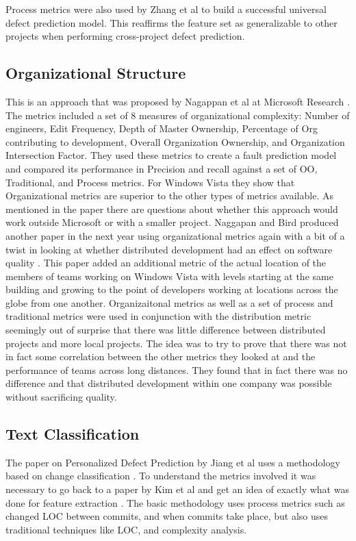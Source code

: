 \documentclass{sig-alternate-05-2015}
\begin{document}
Process metrics were also used by Zhang et al \cite{Zhang2014} to build a successful universal defect prediction model. This reaffirms the feature set as generalizable to other projects when performing cross-project defect prediction.

\subsection{Organizational Structure}
This is an approach that was proposed by Nagappan et al at Microsoft Research \cite{Nagappan}.  The metrics included a set of 8 measures of organizational complexity: Number of engineers, Edit Frequency, Depth of Master Ownership, Percentage of Org contributing to development, Overall Organization Ownership, and Organization Intersection Factor.  They used these metrics to create a fault prediction model and compared its performance in Precision and recall against a set of OO, Traditional, and Process metrics.  For Windows Vista they show that Organizational metrics are superior to the other types of metrics available.  As mentioned in the paper there are questions about whether this approach would work outside Microsoft or with a smaller project.  
Naggapan and Bird produced another paper in the next year using organizational metrics again with a bit of a twist in looking at whether distributed development had an effect on software quality \cite{Bird}.  This paper added an additional metric of the actual location of the members of teams working on Windows Vista with levels starting at the same building and growing to the point of developers working at locations across the globe from one another.  Organizaitonal metrics as well as a set of process and traditional metrics were used in conjunction with the distribution metric seemingly out of surprise that there was little difference between distributed projects and more local projects.  The idea was to try to prove that there was not in fact some correlation between the other metrics they looked at and the performance of teams across long distances.  They found that in fact there was no difference and that distributed development within one company was possible without sacrificing quality.

\subsection{Text Classification}
The paper on Personalized Defect Prediction by Jiang et al uses a methodology based on change classification \cite{Jiang}.  To understand the metrics involved it was necessary to go back to a paper by Kim et al and get an idea of exactly what was done for feature extraction \cite{Kim}.  The basic methodology uses process metrics such as changed LOC between commits, and when commits take place, but also uses traditional techniques like LOC, and complexity analysis.  
\end{document}
